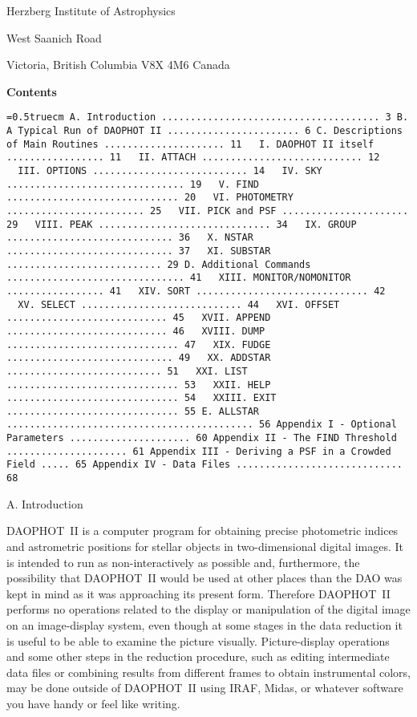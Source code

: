 \indent Herzberg Institute of Astrophysics 

 West Saanich Road

\indent Victoria, British Columbia V8X 4M6 
\medskip
\indent Canada
\vfill
\eject
\centerline{\bf Contents}
\bigskip
{\noindent\obeylines\obeyspaces\frenchspacing\tt\baselineskip=0.5truecm
A. Introduction ......................................  3
B. A Typical Run of DAOPHOT~II .......................  6
C. Descriptions of Main Routines ..................... 11
\ \   I.     DAOPHOT~II itself ................. 11
\ \   II.    ATTACH ............................ 12
\ \   III.   OPTIONS ........................... 14
\ \   IV.    SKY ............................... 19
\ \   V.     FIND .............................. 20
\ \   VI.    PHOTOMETRY ........................ 25
\ \   VII.   PICK and PSF ...................... 29
\ \   VIII.  PEAK .............................. 34
\ \   IX.    GROUP ............................. 36
\ \   X.     NSTAR ............................. 37
\ \   XI.    SUBSTAR ........................... 29
D. Additional Commands ............................... 41
\ \   XIII.  MONITOR/NOMONITOR ................. 41
\ \   XIV.   SORT .............................. 42
\ \   XV.    SELECT ............................ 44
\ \   XVI.   OFFSET ............................ 45
\ \   XVII.  APPEND ............................ 46
\ \   XVIII. DUMP .............................. 47
\ \   XIX.   FUDGE ............................. 49
\ \   XX.    ADDSTAR ........................... 51
\ \   XXI.   LIST .............................. 53
\ \   XXII.  HELP .............................. 54
\ \   XXIII. EXIT .............................. 55
E. ALLSTAR ........................................... 56
Appendix I - Optional Parameters ..................... 60
Appendix II - The FIND Threshold ..................... 61
Appendix III - Deriving a PSF in a Crowded Field ..... 65
Appendix IV - Data Files ............................. 68
}  
\vfill
\eject
\centerline{A.  Introduction}

DAOPHOT~II is a computer program for obtaining precise photometric
indices and astrometric positions for stellar objects in
two-dimensional digital images. It is intended to run as
non-interactively as possible and, furthermore, the possibility that
DAOPHOT~II would be used at other places than the DAO was kept in mind
as it was approaching its present form.  Therefore DAOPHOT~II performs
no operations related to the display or manipulation of the digital
image on an image-display system, even though at some stages in the
data reduction it is useful to be able to examine the picture
visually. Picture-display operations and some other steps in the
reduction procedure, such as editing intermediate data files or
combining results from different frames to obtain instrumental colors,
may be done outside of DAOPHOT~II using IRAF, Midas, or whatever
software you have handy or feel like writing. 

